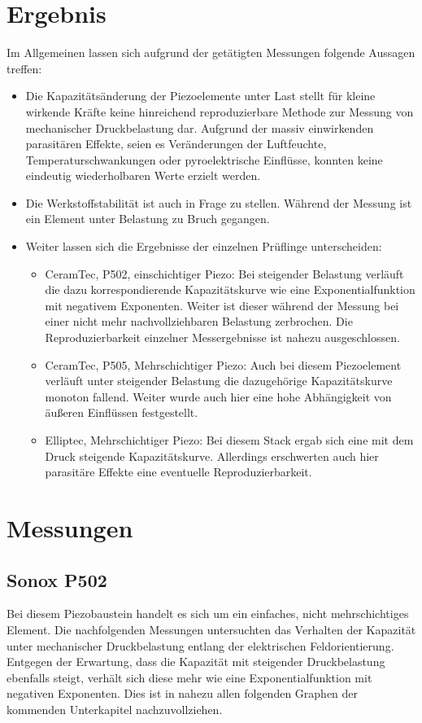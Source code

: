 \documentclass[12pt]{scrreprt} %
\begin{document}
\section{Ergebnis}

Im Allgemeinen lassen sich aufgrund der getätigten Messungen folgende Aussagen treffen:
\begin{itemize}
\item
Die Kapazitätsänderung der Piezoelemente unter Last stellt für kleine wirkende Kräfte keine hinreichend reproduzierbare Methode zur Messung von mechanischer Druckbelastung dar. Aufgrund der massiv einwirkenden parasitären Effekte, seien es Veränderungen der Luftfeuchte, Temperaturschwankungen oder pyroelektrische Einflüsse, konnten keine eindeutig wiederholbaren Werte erzielt werden.
\item
Die Werkstoffstabilität ist auch in Frage zu stellen. Während der Messung ist ein Element unter Belastung zu Bruch gegangen.
\item
Weiter lassen sich die Ergebnisse der einzelnen Prüflinge unterscheiden:
\begin{itemize}
\item
CeramTec, P502, einschichtiger Piezo: Bei steigender Belastung verläuft die dazu korrespondierende Kapazitätskurve wie eine Exponentialfunktion mit negativem Exponenten. Weiter ist dieser während der Messung bei einer nicht mehr nachvollziehbaren Belastung zerbrochen. Die Reproduzierbarkeit einzelner Messergebnisse ist nahezu ausgeschlossen.
\item
CeramTec, P505, Mehrschichtiger Piezo: Auch bei diesem Piezoelement verläuft unter steigender Belastung die dazugehörige Kapazitätskurve monoton fallend. Weiter wurde auch hier eine hohe Abhängigkeit von äußeren Einflüssen festgestellt.
\item
Elliptec, Mehrschichtiger Piezo: Bei diesem Stack ergab sich eine mit dem Druck steigende Kapazitätskurve. Allerdings erschwerten auch hier parasitäre Effekte eine eventuelle Reproduzierbarkeit.
\end{itemize}
\end{itemize}


\section{Messungen}

\subsection{Sonox P502} 
Bei diesem Piezobaustein handelt es sich um ein einfaches, nicht mehrschichtiges Element. Die nachfolgenden Messungen untersuchten das Verhalten der Kapazität unter mechanischer Druckbelastung entlang der elektrischen Feldorientierung. Entgegen der Erwartung, dass die Kapazität mit steigender Druckbelastung ebenfalls steigt, verhält sich diese mehr wie eine Exponentialfunktion mit negativen Exponenten. Dies ist in nahezu allen folgenden Graphen der kommenden Unterkapitel nachzuvollziehen.
\end{document}
